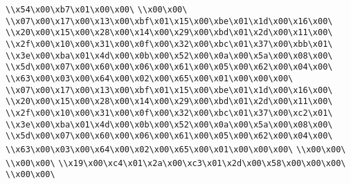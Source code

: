 \verb|\\x54\x00\xb7\x01\x00\x00\|\newline
\verb|\\x00\x00\|\newline
\verb|\\x07\x00\x17\x00\x13\x00\xbf\x01\x15\x00\xbe\x01\x1d\x00\x16\x00\|\newline
\verb|\\x20\x00\x15\x00\x28\x00\x14\x00\x29\x00\xbd\x01\x2d\x00\x11\x00\|\newline
\verb|\\x2f\x00\x10\x00\x31\x00\x0f\x00\x32\x00\xbc\x01\x37\x00\xbb\x01\|\newline
\verb|\\x3e\x00\xba\x01\x4d\x00\x0b\x00\x52\x00\x0a\x00\x5a\x00\x08\x00\|\newline
\verb|\\x5d\x00\x07\x00\x60\x00\x06\x00\x61\x00\x05\x00\x62\x00\x04\x00\|\newline
\verb|\\x63\x00\x03\x00\x64\x00\x02\x00\x65\x00\x01\x00\x00\x00\|\newline
\verb|\\x07\x00\x17\x00\x13\x00\xbf\x01\x15\x00\xbe\x01\x1d\x00\x16\x00\|\newline
\verb|\\x20\x00\x15\x00\x28\x00\x14\x00\x29\x00\xbd\x01\x2d\x00\x11\x00\|\newline
\verb|\\x2f\x00\x10\x00\x31\x00\x0f\x00\x32\x00\xbc\x01\x37\x00\xc2\x01\|\newline
\verb|\\x3e\x00\xba\x01\x4d\x00\x0b\x00\x52\x00\x0a\x00\x5a\x00\x08\x00\|\newline
\verb|\\x5d\x00\x07\x00\x60\x00\x06\x00\x61\x00\x05\x00\x62\x00\x04\x00\|\newline
\verb|\\x63\x00\x03\x00\x64\x00\x02\x00\x65\x00\x01\x00\x00\x00\|\newline
\verb|\\x00\x00\|\newline
\verb|\\x00\x00\|\newline
\verb|\\x19\x00\xc4\x01\x2a\x00\xc3\x01\x2d\x00\x58\x00\x00\x00\|\newline
\verb|\\x00\x00\|\newline
